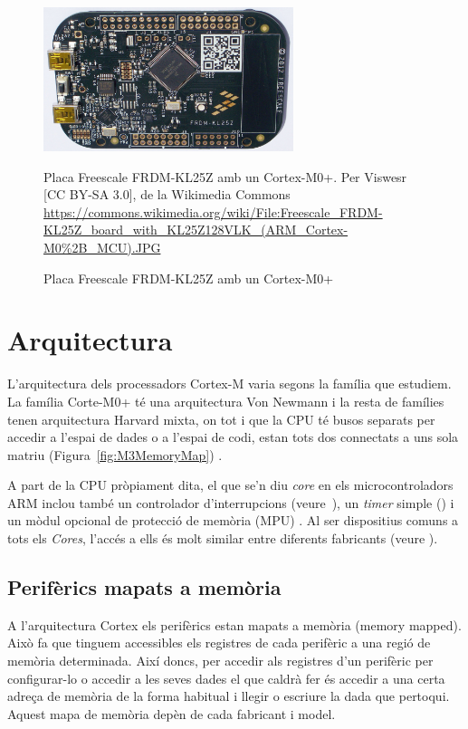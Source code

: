 \begin{figure}
 \centering
 \includegraphics[width=0.65\textwidth, keepaspectratio]{imatges/Freescale_FRDM-KL25Z}
 \caption{Placa Freescale FRDM-KL25Z amb un Cortex-M0+}{Placa Freescale FRDM-KL25Z amb un Cortex-M0+. Per Viswesr [CC BY-SA 3.0], de la Wikimedia Commons \url{https://commons.wikimedia.org/wiki/File:Freescale_FRDM-KL25Z_board_with_KL25Z128VLK_(ARM_Cortex-M0\%2B_MCU).JPG}}
 \label{fig:FRDM}
\end{figure}


\section{Arquitectura}
\label{se:arquitectura}
L'arquitectura dels processadors Cortex-M varia segons la família que estudiem. La família Corte-M0+ té una arquitectura Von Newmann i la resta de famílies tenen arquitectura Harvard mixta, on tot i que la CPU té busos separats per accedir a l'espai de dades o a l'espai de codi, estan tots dos connectats a uns sola matriu (Figura~\ref{fig:M3MemoryMap}) \cite[794]{GuideCortexM3M4}.

A part de la CPU pròpiament dita, el que se'n diu {\em core} en els microcontroladors ARM inclou també un controlador d'interrupcions (veure~), un {\em timer} simple () i un mòdul opcional de protecció de memòria (MPU) \cite[230]{GuideCortexM3M4}. Al ser dispositius comuns a tots els {\em Cores}, l'accés a ells és molt similar entre diferents fabricants (veure ).

\subsection{Perifèrics mapats a memòria}
\label{sub:memory-mapped}
A l'arquitectura Cortex els perifèrics estan mapats a memòria (\gls{memory mapped}). Això fa que tinguem accessibles els registres de cada perifèric a una regió de memòria determinada. Així doncs, per accedir als registres d'un perifèric per configurar-lo o accedir a les seves dades el que caldrà fer és accedir a una certa adreça de memòria de la forma habitual i llegir o escriure la dada que pertoqui. Aquest mapa de memòria depèn de cada fabricant i model.

